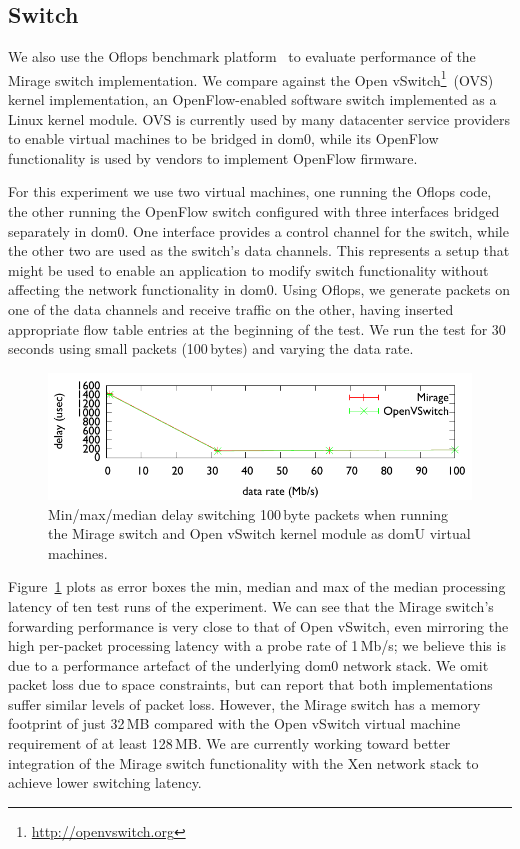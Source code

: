 \subsection{\mirage Switch}

We also use the Oflops benchmark platform~\cite{oflops} to evaluate
performance of the Mirage switch implementation. We compare against the Open
vSwitch\footnote{\url{http://openvswitch.org}}~(OVS) kernel implementation, an
OpenFlow-enabled software switch implemented as a Linux kernel module. OVS is
currently used by many datacenter service providers to enable virtual machines
to be bridged in dom0, while its OpenFlow functionality is used by vendors to
implement OpenFlow firmware.

For this experiment we use two virtual machines, one running the Oflops code,
the other running the OpenFlow switch configured with three interfaces bridged
separately in dom0. One interface provides a control channel for the switch,
while the other two are used as the switch's data channels. This represents a
setup that might be used to enable an application to modify switch
functionality without affecting the network functionality in dom0. Using
Oflops, we generate packets on one of the data channels and receive traffic on
the other, having inserted appropriate flow table entries at the beginning of
the test. We run the test for 30\,seconds using small packets (100\,bytes) and
varying the data rate.

\begin{figure}
\centering
\includegraphics[width=\columnwidth]{switch-media-delay}
\caption{\label{fig:switch}Min/max/median delay switching 100\,byte packets
        when running the Mirage switch and Open vSwitch kernel module as domU
        virtual machines.}
\vspace{-2ex}
\end{figure}

Figure~\ref{fig:switch} plots as error boxes the min, median and max of the
median processing latency of ten test runs of the experiment. We can see that
the Mirage switch's forwarding performance is very close to that of Open
vSwitch, even mirroring the high per-packet processing latency with a probe
rate of 1\,Mb/s; we believe this is due to a performance artefact of the
underlying dom0 network stack. We omit packet loss due to space constraints,
but can report that both implementations suffer similar levels of packet loss.
However, the Mirage switch has a memory footprint of just 32\,MB compared with
the Open vSwitch virtual machine requirement of at least 128\,MB. We are
currently working toward better integration of the Mirage switch functionality
with the Xen network stack to achieve lower switching latency.

